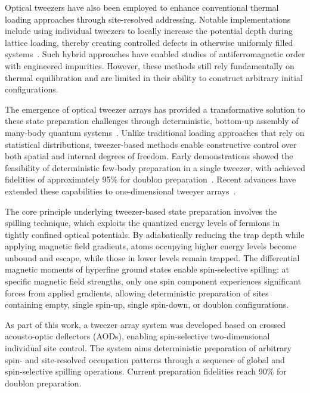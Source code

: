 Optical tweezers have also been employed to enhance conventional thermal loading approaches through site-resolved addressing. Notable implementations include using individual tweezers to locally increase the potential depth during lattice loading, thereby creating controlled defects in otherwise uniformly filled systems~\cite{koepsell_imaging_2019}. Such hybrid approaches have enabled studies of antiferromagnetic order with engineered impurities. However, these methods still rely fundamentally on thermal equilibration and are limited in their ability to construct arbitrary initial configurations.

The emergence of optical tweezer arrays has provided a transformative solution to these state preparation challenges through deterministic, bottom-up assembly of many-body quantum systems~\cite{serwane_deterministic_2011}. Unlike traditional loading approaches that rely on statistical distributions, tweezer-based methods enable constructive control over both spatial and internal degrees of freedom. Early demonstrations showed the feasibility of deterministic few-body preparation in a single tweezer, with achieved fidelities of approximately 95\% for doublon preparation~\cite{stuart_single-atom_2018,holten_pauli_2022}. Recent advances have extended these capabilities to one-dimensional tweeyer arrays~\cite{gyger_continuous_2024,spar_realization_2022}.

The core principle underlying tweezer-based state preparation involves the spilling technique, which exploits the quantized energy levels of fermions in tightly confined optical potentials. By adiabatically reducing the trap depth while applying magnetic field gradients, atoms occupying higher energy levels become unbound and escape, while those in lower levels remain trapped. The differential magnetic moments of hyperfine ground states enable spin-selective spilling: at specific magnetic field strengths, only one spin component experiences significant forces from applied gradients, allowing deterministic preparation of sites containing empty, single spin-up, single spin-down, or doublon configurations.

As part of this work, a tweezer array system was developed based on crossed acousto-optic deflectors (AODs), enabling spin-selective two-dimensional individual site control. The system aims deterministic preparation of arbitrary spin- and site-resolved occupation patterns through a sequence of global and spin-selective spilling operations. Current preparation fidelities reach 90\% for doublon preparation.

